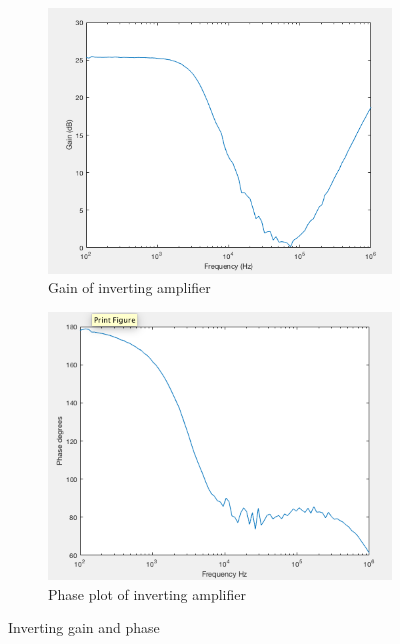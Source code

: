				\begin{figure}[H]
		\centering
		\begin{subfigure}[b]{0.45\textwidth}
			\centering
		\includegraphics[scale=.40]{ExperimentalImplementation/invertingain.png}
\caption{Gain of inverting amplifier}
\label{fig:invertinggain1}
		\end{subfigure}
		\hfill
		\begin{subfigure}[b]{0.45\textwidth}
			\centering
		\includegraphics[scale=.40]{ExperimentalImplementation/invertingphase.png}
\caption{Phase plot of inverting amplifier}
\label{fig:invertingphase}
		\end{subfigure}
		\caption{Inverting gain and phase}
		\label{fig:invertinggain}
	\end{figure} 




